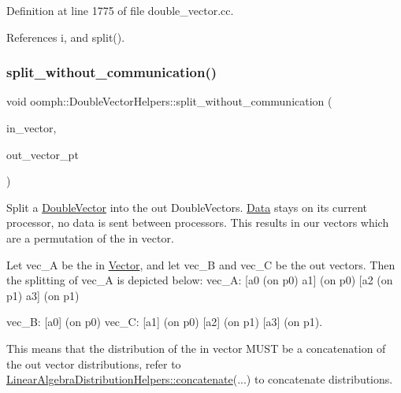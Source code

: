 Definition at line 1775 of file double\+\_\+vector.\+cc.



References i, and split().

\mbox{\label{namespaceoomph_1_1DoubleVectorHelpers_ab983914eb27cc57a2184bca42e9a77a0}} 
\subsubsection{\texorpdfstring{split\+\_\+without\+\_\+communication()}{split\_without\_communication()}\hspace{0.1cm}{\footnotesize\ttfamily [1/2]}}
{\footnotesize\ttfamily void oomph\+::\+Double\+Vector\+Helpers\+::split\+\_\+without\+\_\+communication (\begin{DoxyParamCaption}\item[{const \hyperlink{classoomph_1_1DoubleVector}{Double\+Vector} \&}]{in\+\_\+vector,  }\item[{\hyperlink{classoomph_1_1Vector}{Vector}$<$ \hyperlink{classoomph_1_1DoubleVector}{Double\+Vector} $\ast$$>$ \&}]{out\+\_\+vector\+\_\+pt }\end{DoxyParamCaption})}



Split a \hyperlink{classoomph_1_1DoubleVector}{Double\+Vector} into the out Double\+Vectors. \hyperlink{classoomph_1_1Data}{Data} stays on its current processor, no data is sent between processors. This results in our vectors which are a permutation of the in vector. 

Let vec\+\_\+A be the in \hyperlink{classoomph_1_1Vector}{Vector}, and let vec\+\_\+B and vec\+\_\+C be the out vectors. Then the splitting of vec\+\_\+A is depicted below\+: vec\+\_\+A\+: \mbox{[}a0 (on p0) a1\mbox{]} (on p0) \mbox{[}a2 (on p1) a3\mbox{]} (on p1)

vec\+\_\+B\+: \mbox{[}a0\mbox{]} (on p0) vec\+\_\+C\+: \mbox{[}a1\mbox{]} (on p0) \mbox{[}a2\mbox{]} (on p1) \mbox{[}a3\mbox{]} (on p1).

This means that the distribution of the in vector M\+U\+ST be a concatenation of the out vector distributions, refer to \hyperlink{namespaceoomph_1_1LinearAlgebraDistributionHelpers_ad3ba423fba64e7db91e9155efa7df5d0}{Linear\+Algebra\+Distribution\+Helpers\+::concatenate}(...) to concatenate distributions. 

